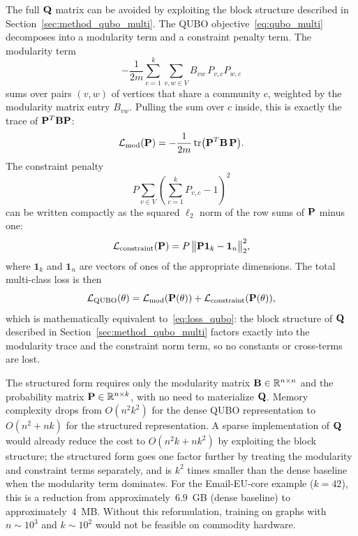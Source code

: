 The full $\mathbf{Q}$ matrix can be avoided by exploiting the block
structure described in Section~\ref{sec:method_qubo_multi}.
The QUBO objective~\eqref{eq:qubo_multi} decomposes into a
modularity term and a constraint penalty term. The modularity term
\begin{equation*}
    -\frac{1}{2m} \sum_{c=1}^{k} \sum_{v,w \in V} B_{vw} \,
    P_{v,c} P_{w,c}
\end{equation*}
sums over pairs $(v, w)$ of vertices that share a community $c$,
weighted by the modularity matrix entry $B_{vw}$. Pulling the
sum over $c$ inside, this is exactly the trace of $\mathbf{P}^T \mathbf{B} \mathbf{P}$:
\begin{equation}
    \mathcal{L}_{\mathrm{mod}}(\mathbf{P}) = -\frac{1}{2m} \, \mathrm{tr}\bigl(
    \mathbf{P}^T \mathbf{B} \, \mathbf{P} \bigr).
    \label{eq:loss_mod_efficient}
\end{equation}
The constraint penalty
\begin{equation*}
    P \sum_{v \in V} \left( \sum_{c=1}^{k} P_{v,c} - 1 \right)^2
\end{equation*}
can be written compactly as the squared $\ell_2$ norm of the row
sums of $\mathbf{P}$ minus one:
\begin{equation}
    \mathcal{L}_{\mathrm{constraint}}(\mathbf{P}) = P \, \bigl\| \mathbf{P} \mathbf{1}_k
    - \mathbf{1}_n \bigr\|_2^2,
    \label{eq:loss_constraint_efficient}
\end{equation}
where $\mathbf{1}_k$ and $\mathbf{1}_n$ are vectors of ones of the
appropriate dimensions. The total multi-class loss is then
\begin{equation}
    \mathcal{L}_{\mathrm{QUBO}}(\theta) = \mathcal{L}_{\mathrm{mod}}(\mathbf{P}(\theta))
    + \mathcal{L}_{\mathrm{constraint}}(\mathbf{P}(\theta)),
    \label{eq:loss_total_efficient}
\end{equation}
which is mathematically equivalent to~\eqref{eq:loss_qubo}: the
block structure of $\mathbf{Q}$ described in
Section~\ref{sec:method_qubo_multi} factors exactly into the
modularity trace and the constraint norm term, so no constants or
cross-terms are lost.

The structured form requires only the modularity matrix
$\mathbf{B} \in \mathbb{R}^{n \times n}$ and the probability matrix
$\mathbf{P} \in \mathbb{R}^{n \times k}$, with no need to materialize
$\mathbf{Q}$. Memory complexity drops from $O(n^2 k^2)$ for the dense
QUBO representation to $O(n^2 + nk)$ for the structured
representation. A sparse implementation of $\mathbf{Q}$ would already
reduce the cost to $O(n^2 k + n k^2)$ by exploiting the block
structure; the structured form goes one factor further by
treating the modularity and constraint terms separately, and is
$k^2$ times smaller than the dense baseline when the modularity
term dominates. For the Email-EU-core example ($k=42$), this is
a reduction from approximately~$6.9$~GB (dense baseline) to
approximately~$4$~MB. Without this reformulation, training on
graphs with $n \sim 10^3$ and $k \sim 10^2$ would not be
feasible on commodity hardware.


